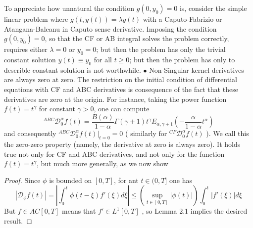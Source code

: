 \documentclass[twoside]{book}
\begin{document}
{\newline
To appreciate how unnatural the condition $g(0,y_0)=0$ is, consider the simple linear problem where $g(t,y(t)) = \lambda y(t)$ with a Caputo-Fabrizio or Atangana-Baleanu in Caputo sense derivative. Imposing the condition $g(0,y_0)=0$, so that the CF or AB integral solves the problem correctly, requires either $\lambda = 0$ or $y_0=0$; but then the problem has only the trivial constant solution $y(t) \equiv y_0$ for all $t \geq 0$; but then the problem has only to describle constant solution is not worthwhile.
\newline
$\bullet$ Non-Singular kernel derivatives are always zero at zero. The restriction on the initial condition of differential equations with CF and ABC derivatives is consequence of the fact that these derivatives are zero at the origin. For instance, taking the power function $f(t) = t^\gamma$ for constant $\gamma >0$, one can compute
$$ ^{ABC}\mathcal{D}^{\alpha}_0 f(t) = \frac{B(\alpha)}{1-\alpha} \Gamma{(\gamma +1)} t^\gamma E_{\alpha, \gamma+1}(-\frac{\alpha}{1-\alpha}t^\alpha)$$
and consequently $^{ABC}\mathcal{D}^{\alpha}_{0}f(t) |_{t=0} = 0$  ( similarly for $^{CF}\mathcal{D}^{\alpha}_{0}f(t)$ ). We call this the zero-zero property (namely, the derivative at zero is always zero). It holds true not only for CF and ABC derivatives, and not only for the function $f(t) = t^\gamma$, but much more generally, as we now show


\begin{proof}

    Since $\phi$ is bounded on $[0,T]$, for ant $t \in (0,T]$ one has
    \begin{equation*}
        |\mathcal{D}_{\phi}f(t)| = \left| \int_0^t \phi(t-\xi)f'(\xi) d\xi \right| \leq (\sup_{t \in [0,T]} |\phi(t)|) \int_0^t |f'(\xi) | d\xi
    \end{equation*}
    But $f \in  AC[0,T]$ means that $f' \in L^1[0,T]$ , so Lemma 2.1 implies the desired result.

\end{proof}


}
\end{document}

